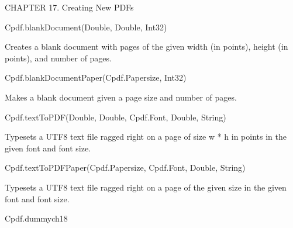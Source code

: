 CHAPTER 17. Creating New PDFs

Cpdf.blankDocument(Double, Double, Int32)


Creates a blank document with
pages of the given width (in points), height (in points), and number of
pages.


Cpdf.blankDocumentPaper(Cpdf.Papersize, Int32)


Makes a blank document given
a page size and number of pages.


Cpdf.textToPDF(Double, Double, Cpdf.Font, Double, String)


Typesets a UTF8 text file
ragged right on a page of size w * h in points in the given font and font
size.


Cpdf.textToPDFPaper(Cpdf.Papersize, Cpdf.Font, Double, String)


Typesets a UTF8 text file
ragged right on a page of the given size in the given font and font size.


Cpdf.dummych18

